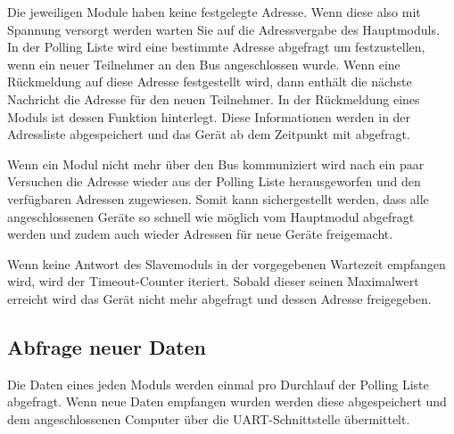


\textmd{Die jeweiligen Module haben keine festgelegte Adresse. Wenn diese also mit Spannung versorgt werden warten Sie auf die Adressvergabe des Hauptmoduls.\\
	In der Polling Liste wird eine bestimmte Adresse abgefragt um festzustellen, wenn ein neuer Teilnehmer an den Bus angeschlossen wurde. Wenn eine Rückmeldung auf diese Adresse festgestellt wird, dann enthält die nächste Nachricht die Adresse für den neuen Teilnehmer.
	In der Rückmeldung eines Moduls ist dessen Funktion hinterlegt. Diese Informationen werden in der Adressliste abgespeichert und das Gerät ab dem Zeitpunkt mit abgefragt.\\
}

\newpage


\textmd{Wenn ein Modul nicht mehr über den Bus kommuniziert wird nach ein paar Versuchen die Adresse wieder aus der Polling Liste herausgeworfen und den verfügbaren Adressen zugewiesen. Somit kann sichergestellt werden, dass alle angeschlossenen Geräte so schnell wie möglich vom Hauptmodul abgefragt werden und zudem auch wieder Adressen für neue Geräte freigemacht.
}



\textmd{Wenn keine Antwort des Slavemoduls in der vorgegebenen Wartezeit empfangen wird, wird der Timeout-Counter iteriert. Sobald dieser seinen Maximalwert erreicht wird das Gerät nicht mehr abgefragt und dessen Adresse freigegeben.
}

\newpage
\subsection{Abfrage neuer Daten}
\textmd{Die Daten eines jeden Moduls werden einmal pro Durchlauf der Polling Liste abgefragt. Wenn neue Daten empfangen wurden werden diese abgespeichert und dem angeschlossenen Computer über die UART-Schnittstelle übermittelt.
}



\newpage
